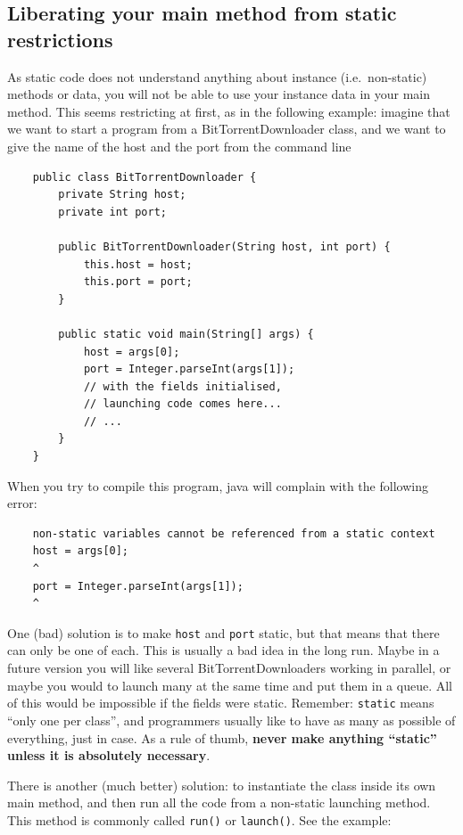 \subsection*{Liberating your main method from static restrictions}
\label{sec:liber-your-launch}

As static code does not understand anything about instance
(i.e.~non-static) methods or data, you will not be able to use your
instance data in your main method. This seems restricting at first,
as in the following example: imagine that we want to start a program
from a BitTorrentDownloader class, and we want to give the name of the
host and the port from the command line

\begin{verbatim}
    public class BitTorrentDownloader {
        private String host;
        private int port;
    
        public BitTorrentDownloader(String host, int port) {
            this.host = host;
            this.port = port;
        }
    
        public static void main(String[] args) {
            host = args[0];
            port = Integer.parseInt(args[1]);
            // with the fields initialised, 
            // launching code comes here...
            // ...
        }
    }
\end{verbatim}

When you try to compile this program, java will complain with the
following error: 

\begin{verbatim}
    non-static variables cannot be referenced from a static context
    host = args[0];
    ^
    port = Integer.parseInt(args[1]);
    ^
\end{verbatim}

One (bad) solution is to make \verb+host+ and \verb+port+ static, but
that means that there can only be one of each. This is usually a bad
idea in the long run. Maybe in a future version you will like several
BitTorrentDownloaders working in parallel, or maybe you would to
launch many at the same time and put them in a queue. All of this
would be impossible if the fields were static. Remember: \verb+static+
means ``only one per class'', and programmers usually like to have as
many as possible of everything, just in case. As a rule of thumb,
\textbf{never make anything ``static'' unless it is absolutely necessary}.

There is another (much better) solution: to instantiate the class
inside its own main method, and then run all the code from a non-static
launching method. This method is commonly called \verb+run()+ or
\verb+launch()+. See the example: 

